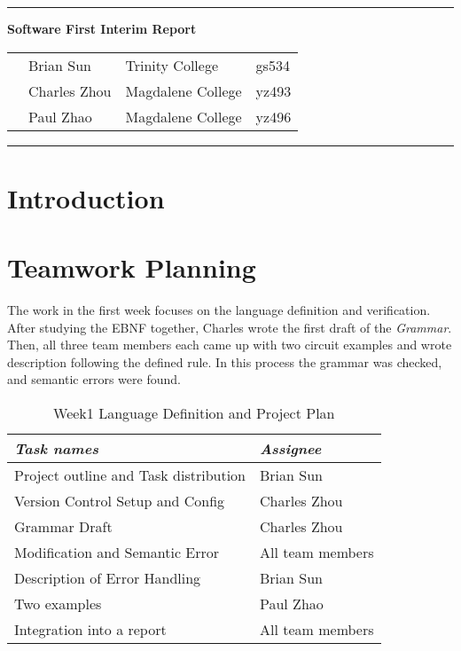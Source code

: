\documentclass[12pt]{article}
\def\n{\noindent}
\begin{document}
\vspace{0.3cm}
\rule{15.7cm}{0.5mm}


\begin{center}
{\hspace{0.6cm}\Large \textbf {Software First Interim Report}\\
}
\end{center}
\begin{table}[H]
\centering
\begin{tabular}{ p{1.5cm}p{5cm}p{6cm} p{6cm}} 
&Brian Sun & Trinity College & gs534 \\ 
&Charles Zhou & Magdalene College & yz493 \\ 
&Paul Zhao & Magdalene College & yz496 \\ 
\end{tabular}
\end{table}


\begin{center}
\rule{15.7cm}{0.5mm}
\end{center}

\section{Introduction}
\section{Teamwork Planning}
\n The work in the first week focuses on the language definition and verification. After studying the EBNF together, Charles wrote the first draft of the \textit{Grammar}. Then, all three team members each came up with two circuit examples and wrote description following the defined rule. In this process the grammar was checked, and semantic errors were found. \\
\begin{table}[H]
\begin{tabular}{p{8cm}p{5cm}} 
\textit{Task names} & \textit{Assignee}\\
\hline
Project outline and Task distribution & Brian Sun\\
Version Control Setup and Config & Charles Zhou\\
Grammar Draft 	& Charles Zhou\\
Modification and Semantic Error & All team members\\
Description of Error Handling & Brian Sun\\
Two examples & Paul Zhao\\
Integration into a report & All team members\\
\end{tabular}
\caption{Week1 Language Definition and Project Plan}
\end{table}
\end{document}
